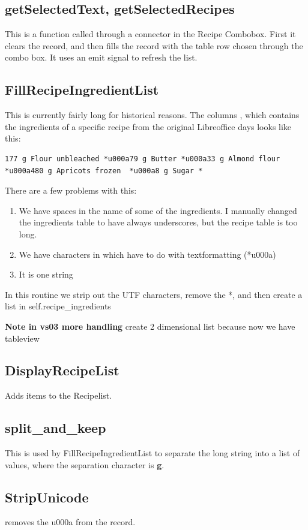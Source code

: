 \documentclass[12pt]{article}
\begin{document}
\subsection{getSelectedText, getSelectedRecipes}
This is a function called through a connector in the Recipe Combobox. First it clears the record, and then 
fills the record with the table row chosen through the combo box. It uses an emit signal to refresh the list.
\subsection{FillRecipeIngredientList}
This is currently fairly long for historical reasons. The columns , which contains the ingredients of a specific recipe from the original Libreoffice days looks like this:

\begin{verbatim}
177 g Flour unbleached *u000a79 g Butter *u000a33 g Almond flour *u000a480 g Apricots frozen  *u000a8 g Sugar *
\end{verbatim}
There are a few problems with this:
\begin{enumerate}
\item We have spaces in the name of some of the ingredients. I manually changed the ingredients table to have always underscores, but the recipe table is too long.
\item We have characters in which have to do with textformatting (*u000a)
\item It is one string
\end{enumerate}

In this routine we strip out the UTF characters, remove the *, and then create a list in self.recipe\_ingredients

{\bf Note in vs03 more handling} create 2 dimensional list because now we have tableview
\subsection{DisplayRecipeList}
Adds items to the Recipelist.

\subsection{split\_and\_keep}
This is used by FillRecipeIngredientList to separate the long string into a list of values, where the separation character is {\bf g}.
\subsection{StripUnicode}
removes the u000a from the record.
\end{document}
